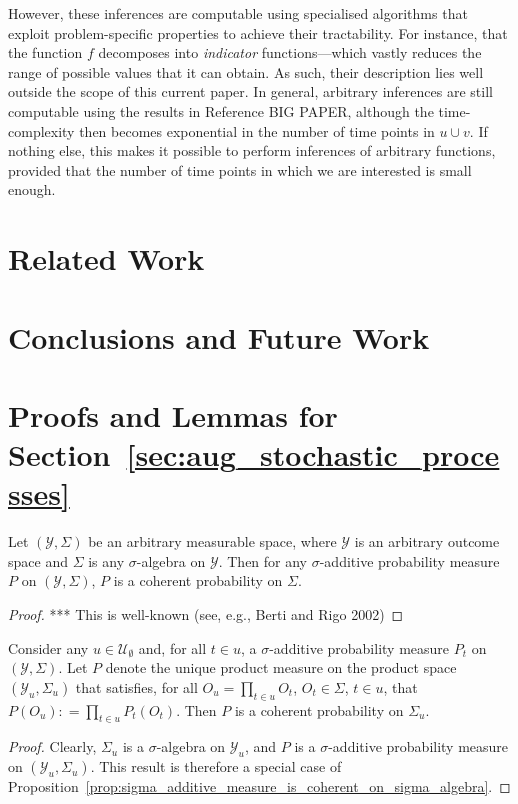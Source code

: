 \documentclass[twoside,11pt]{article}
\newcommand{\observs}{\mathcal{Y}}
\newcommand{\coloneqq}{:\!=}
\begin{document}
However, these inferences are computable using specialised algorithms that exploit problem-specific properties to achieve their tractability. For instance, that the function $f$ decomposes into \emph{indicator} functions---which vastly reduces the range of possible values that it can obtain. As such, their description lies well outside the scope of this current paper. In general, arbitrary inferences are still computable using the results in Reference BIG PAPER, although the time-complexity then becomes exponential in the number of time points in $u\cup v$. If nothing else, this makes it possible to perform inferences of arbitrary functions, provided that the number of time points in which we are interested is small enough.

\section{Related Work}\label{sec:related}

\section{Conclusions and Future Work}\label{sec:conclusions}




\newpage

\appendix


\section{Proofs and Lemmas for Section~\ref{sec:aug_stochastic_processes}}

\begin{proposition}\label{prop:sigma_additive_measure_is_coherent_on_sigma_algebra}
Let $(\observs,\Sigma)$ be an arbitrary measurable space, where $\observs$ is an arbitrary outcome space and $\Sigma$ is any $\sigma$-algebra on $\observs$. Then for any $\sigma$-additive probability measure $P$ on $(\observs,\Sigma)$, $P$ is a coherent probability on $\Sigma$.
\end{proposition}
\begin{proof}
*** This is well-known (see, e.g., Berti and Rigo 2002)
\end{proof}

\begin{corollary}\label{cor:product_measure_is_coherent}
Consider any $u\in\mathcal{U}_\emptyset$ and, for all $t\in u$, a $\sigma$-additive probability measure $P_t$ on $(\observs,\Sigma)$. Let $P$ denote the unique product measure on the product space $(\observs_u,\Sigma_u)$ that satisfies, for all $O_u=\prod_{t\in u} O_t$, $O_t\in\Sigma$, $t\in u$, that $P(O_u)\coloneqq \prod_{t\in u}P_t(O_t)$. Then $P$ is a coherent probability on $\Sigma_u$.
\end{corollary}
\begin{proof}
Clearly, $\Sigma_u$ is a $\sigma$-algebra on $\observs_u$, and $P$ is a $\sigma$-additive probability measure on $(\observs_u,\Sigma_u)$. This result is therefore a special case of Proposition~\ref{prop:sigma_additive_measure_is_coherent_on_sigma_algebra}.
\end{proof}
\end{document}
